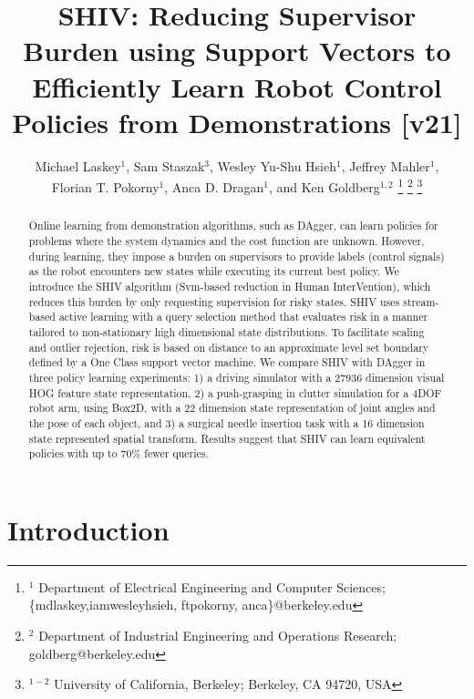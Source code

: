 \documentclass[10pt, conference]{ieeeconf}      %
\title{SHIV: Reducing Supervisor Burden using Support Vectors to Efficiently Learn Robot Control Policies from Demonstrations [v21]}
\author{Michael Laskey$^1$, Sam Staszak$^3$, Wesley Yu-Shu Hsieh$^1$, Jeffrey Mahler$^1$, \\ Florian T. Pokorny$^1$, Anca D. Dragan$^1$, and Ken Goldberg$^{1,2}$%
\thanks{$^1$ Department of Electrical Engineering and Computer Sciences; {\small \{mdlaskey,iamwesleyhsieh, ftpokorny, anca\}@berkeley.edu}}%
\thanks{$^2$ Department of Industrial Engineering and Operations Research; {\small goldberg@berkeley.edu}}%
\thanks{$^{1-2}$ University of California, Berkeley;  Berkeley, CA 94720, USA}%
}
\begin{document}
\maketitle
\thispagestyle{empty}
\pagestyle{empty}



\begin{abstract}
Online learning from demonstration algorithms, such as DAgger, can learn policies for problems where the system
dynamics and the cost function are unknown. However, during learning, they impose a burden on supervisors to provide labels (control
signals) as the robot encounters new states while executing its current best policy. We introduce the SHIV
algorithm (Svm-based reduction in Human InterVention), which reduces this burden by only requesting supervision for risky states. SHIV uses stream-based active learning with a query selection method that evaluates risk in a manner tailored to non-stationary high dimensional state distributions.  To facilitate scaling and outlier rejection, risk is based on distance to an approximate level set boundary defined by a One Class support vector machine.  We compare SHIV with DAgger in three policy learning experiments: 1) a driving simulator with a 27936 dimension visual HOG feature state representation, 2) a push-grasping in clutter simulation for a 4DOF robot arm, using Box2D, with a 22 dimension state representation  of joint angles and the pose of each object, and 3) a surgical needle insertion task with a 16 dimension state represented spatial transform.  Results suggest that SHIV can learn equivalent policies with up to 70\% fewer queries.

 \end{abstract}



\section{Introduction} 
\end{document}
